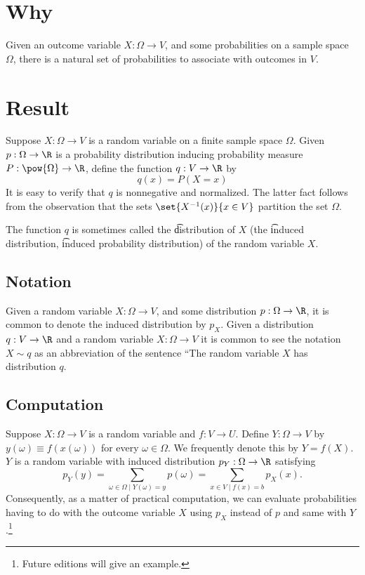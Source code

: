 
\section*{Why}

Given an outcome variable $X: \Omega  \to V$, and some probabilities on a sample space $\Omega $, there is a natural set of probabilities to associate with outcomes in $V$.

\section*{Result}

Suppose $X: \Omega  \to V$ is a random variable on a finite sample space $\Omega $.
Given $p: \Omega  \to \R $ is a probability distribution inducing probability measure $P: \pow{\Omega } \to \R $, define the function $q: V \to \R $ by
\[
q(x) = P(X = x)
\]
It is easy to verify that $q$ is nonnegative and normalized.
The latter fact follows from the observation that the sets $\set{X^{-1}(x)}{x \in V}$ partition the set $\Omega $.

The function $q$ is sometimes called the \t{distribution of $X$} (the \t{induced distribution}, \t{induced probability distribution}) of the random variable $X$.

\subsection*{Notation}

Given a random variable $X: \Omega  \to V$, and some distribution $p: \Omega  \to \R $, it is common to denote the induced distribution by $p_X$.
Given a distribution $q: V \to \R $ and a random variable $X: \Omega  \to V$ it is common to see the notation $X \sim q$ as an abbreviation of the sentence ``The random variable $X$ has distribution $q$.

\subsection*{Computation}

Suppose $X: \Omega  \to V$ is a random variable and $f: V \to U$.
Define $Y: \Omega  \to V$ by $y(\omega ) \equiv f(x(\omega ))$ for every $\omega  \in \Omega $.
We frequently denote this by $Y = f(X)$.
$Y$ is a random variable with induced distribution $p_{Y}: \Omega  \to \R $ satisfying
\[
\textstyle
p_{Y}(y) = \sum_{\omega  \in \Omega  \mid  Y(\omega ) = y} p(\omega ) = \sum_{x \in V \mid  f(x) = b} p_X(x).
\]
Consequently, as a matter of practical computation, we can evaluate probabilities having to do with the outcome variable $X$ using $p_X$ instead of $p$ and same with $Y$.\footnote{Future editions will give an example.}

\blankpage